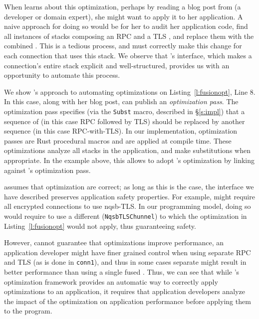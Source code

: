 {When \fAlice learns about this optimization, perhaps by reading a blog post from \fOctavia (a \tunnel developer or domain expert), she might want to apply it to her application. 
A naive approach for doing so would be for her to audit her application code, find all instances of \tunnel stacks composing an RPC \tunnel and a TLS \tunnel, and replace them with the combined \tunnel. This is a tedious process, and \fAlice must correctly make this change for each connection that uses this \tunnel stack. 
We observe that \name's interface, which makes a connection's entire \tunnel stack explicit and well-structured, provides us with an opportunity to automate this process.

We show \name's approach to automating optimizations on Listing~\ref{l:fusionopt}, Line 8. In this case, along with her blog post, \fOctavia can publish an \emph{optimization pass}. 
The optimization pass specifies (via the \texttt{Subst} macro, described in \S\ref{s:impl}) that a sequence of \tunnels (in this case RPC followed by TLS) should be replaced by another sequence (in this case RPC-with-TLS). 
In our implementation, optimization passes are Rust procedural macros and are applied at compile time. These optimizations analyze all \tunnel stacks in the application, and make substitutions when appropriate. In the example above, this allows \fAlice to adopt \fOctavia's optimization by linking against \fOctavia's optimization pass.

\name assumes that optimization are correct; as long as this is the case, the interface we have described preserves application safety properties. For example, \fAlice might require all encrypted connections to use nqsb-TLS. In our programming model, doing so would require \fAlice to use a different \tunnel (\eg \texttt{NqsbTLSChunnel}) to which the optimization in Listing~\ref{l:fusionopt} would not apply, thus guaranteeing safety. 

However, \name cannot guarantee that optimizations improve performance, \eg an application developer might have finer grained control when using separate RPC and TLS \tunnels (as is done in \texttt{conn1}), and thus in some cases separate \tunnels might result in better performance than using a single fused \tunnel. 
Thus, we can see that while \name's optimization framework provides an automatic way to correctly apply optimizations to an application, it requires that application developers analyze the impact of the optimization on application performance before applying them to the program. 
}